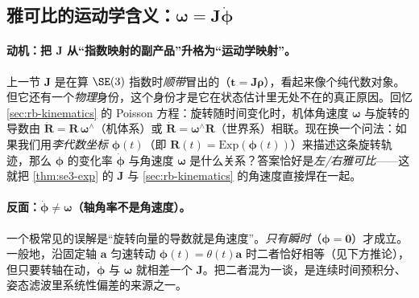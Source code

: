 \subsection{雅可比的运动学含义：\texorpdfstring{$\boldsymbol{\omega}=\mathbf{J}\dot{\boldsymbol{\phi}}$}{omega = J phidot}}
\label{subsec:kinematics-jacobian}

\paragraph{动机：把 $\mathbf{J}$ 从“指数映射的副产品”升格为“运动学映射”。}
上一节 $\mathbf{J}$ 是在算 $\SE(3)$ 指数时\emph{顺带}冒出的（$\mathbf{t}=\mathbf{J}\boldsymbol{\rho}$），看起来像个纯代数对象。但它还有一个\emph{物理}身份，这个身份才是它在状态估计里无处不在的真正原因。回忆 \cref{sec:rb-kinematics} 的 Poisson 方程：旋转随时间变化时，机体角速度 $\boldsymbol{\omega}$ 与旋转的导数由 $\dot{\mathbf{R}}=\mathbf{R}\,\boldsymbol{\omega}^\wedge$（机体系）或 $\dot{\mathbf{R}}=\boldsymbol{\omega}^\wedge\mathbf{R}$（世界系）相联。现在换一个问法：如果我们用\emph{李代数坐标} $\boldsymbol{\phi}(t)$（即 $\mathbf{R}(t)=\mathrm{Exp}(\boldsymbol{\phi}(t))$）来描述这条旋转轨迹，那么 $\boldsymbol{\phi}$ 的变化率 $\dot{\boldsymbol{\phi}}$ 与角速度 $\boldsymbol{\omega}$ 是什么关系？答案恰好是\emph{左/右雅可比}——这就把 \cref{thm:se3-exp} 的 $\mathbf{J}$ 与 \cref{sec:rb-kinematics} 的角速度直接焊在一起。

\paragraph{反面：$\dot{\boldsymbol{\phi}}\neq\boldsymbol{\omega}$（轴角率不是角速度）。}
一个极常见的误解是“旋转向量的导数就是角速度”。\emph{只有瞬时}（$\boldsymbol{\phi}=\mathbf{0}$）才成立。一般地，沿固定轴 $\mathbf{a}$ 匀速转动 $\boldsymbol{\phi}(t)=\theta(t)\mathbf{a}$ 时二者恰好相等（见下方推论），但只要转轴在动，$\dot{\boldsymbol{\phi}}$ 与 $\boldsymbol{\omega}$ 就相差一个 $\mathbf{J}$。把二者混为一谈，是连续时间预积分、姿态滤波里系统性偏差的来源之一。

